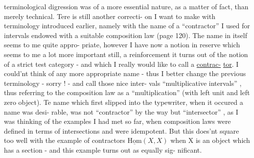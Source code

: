 
 terminological digression was of a more essential nature, as a
matter of fact, than merely technical. Tere is still another correcti-%
on I want to make with terminology introduced earlier, namely  with
the name of a ``contractor'' I used for intervals endowed with a suitable
composition law (page 120). The name in itself seems to me quite appro-%
priate, however I have now a notion in reserve which seems to me a lot
more important still, a reinforcement it turns out of the notion of a
strict test category - and which I really would like to call a \uline{contrac-}%
\uline{tor}. I could'nt think of any more appropriate name - thus I better
change the previous terminology - sorry ! - and call those nice inter-%
vals ``multiplicative intervals'' , thus referring to the composition law
as a ``multiplication'' (with left unit and left zero object). Te name
which first slipped into the typewriter, when it occured a name was desi-%
rable, was not ``contractor'' by the way but ``intersector'' , as I was
thinking of the examples I had met so far, when composition laws were
defined in terms of intersections and were idempotent. But this does'nt
square too well with the example of contractors $\underline{\mathrm{Hom}}(X,X)$\hand{,} when X is an
object which has a section - and this example turns out as equally sig-%
nificant.

